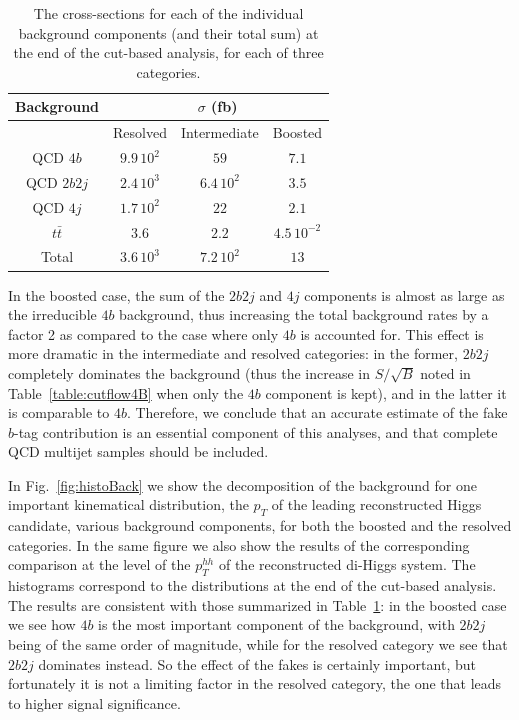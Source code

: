 \begin{table}[t]
  \centering
  \begin{tabular}{c|c|c|c}
    \hline
    Background  &    \multicolumn{3}{c}{$\sigma$ (fb)}   \\
    \hline
  &    Resolved  &  Intermediate  &   Boosted \\
    \hline
    \hline
  QCD $4b$   &   $9.9\,10^{2}$       &  $59$       &   $7.1$        \\
  QCD $2b2j$ &   $2.4\,10^{3}$       &  $6.4\,10^{2}$       &   $3.5$        \\
  QCD $4j$ &     $1.7\,10^{2}$       &   $22$      &    $2.1$        \\
  $t\bar{t}$ &   $3.6$       &  $2.2$       &   $4.5\,10^{-2}$        \\
  \hline
  \hline
Total     &    $3.6\,10^{3}$      &   $7.2\,10^{2}$      &     $13$      \\
\hline
\end{tabular}
    \caption{\small The cross-sections for each of the individual background
      components (and their total sum) at the end of the cut-based
      analysis, for each of three categories.
    \label{table:cutflowBack}
    }
\end{table}

In the boosted case, the sum of the $2b2j$ and $4j$ components is almost as large as the
irreducible $4b$ background, thus increasing the total background rates by a factor 2 as compared
to the case where only $4b$ is accounted for.
%
This effect is more dramatic in the intermediate and resolved categories: in the former,
$2b2j$ completely dominates the background (thus the increase in $S/\sqrt{B}$ noted in
Table~\ref{table:cutflow4B}  when only the $4b$ component is kept), and in the latter
it is comparable to $4b$.
%
Therefore, we conclude that an accurate estimate of the fake $b$-tag contribution is
an essential component of this analyses, and that complete QCD multijet samples
should be included.

In Fig.~\ref{fig:histoBack} we show the decomposition of the background for one important kinematical
distribution, the $p_T$ of the leading reconstructed Higgs candidate, various background
components, for both the boosted and the resolved categories.
%
In the same figure we also show the results of the corresponding comparison
at the level of the $p_T^{hh}$ of the
reconstructed di-Higgs system.
%
The histograms correspond to the distributions at the end of the cut-based
analysis.
%
The results are consistent with those summarized in
Table~\ref{table:cutflowBack}: in the boosted case we see how $4b$ is the most important
component of the background, with $2b2j$ being of the same order of magnitude, while
for the resolved category we see that $2b2j$ dominates instead.
%
So the effect of the fakes is certainly important, but fortunately it is not a limiting factor
in the resolved category, the one that leads to higher signal significance.

